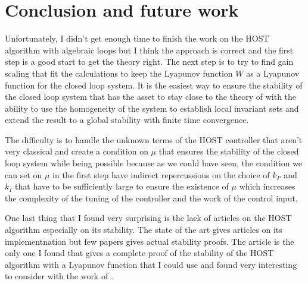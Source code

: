 \section{Conclusion and future work}

Unfortunately, I didn't get enough time to finish the work on the HOST algorithm with algebraic loops
but I think the approach is correct and the first step is a good start to get the theory right. The next step
is to try to find gain scaling that fit the calculations to keep the Lyapunov function \(W\) as a Lyapunov 
function for the closed loop system. It is the easiest way to ensure the stability of the closed loop system that 
has the asset to stay close to the theory of \cite{tietze2025dynamic} with the ability to use the homogeneity
of the system to establish local invariant sets and extend the result to a global stability with finite time 
convergence.


The difficulty is to handle the unknown terms of the HOST controller that aren't very classical and 
create a condition on \( \mu \) that ensures the stability of the closed loop system while being 
possible because as we could have seen, the condition we can set on \( \mu \) in the first step have 
indirect repercussions on the choice of \( k_P \) and \( k_I \) that have to be sufficiently large to 
ensure the existence of \( \mu \) which increases the complexity of the tuning of the controller and the
work of the control input.

One last thing that I found very surprising is the lack of articles on the HOST algorithm especially on its
stability. The state of the art gives articles on its implementnation but few papers gives actual stability
proofs. The article \cite{Laghrouche2017} is the only one I found that gives a complete proof of the stability
of the HOST algorithm with a Lyapunov function that I could use and found very interesting to consider with
the work of \cite{tietze2025dynamic}.

